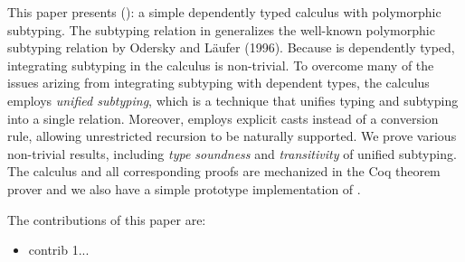 This paper presents \system (\name): a simple dependently typed
calculus with polymorphic subtyping. The subtyping relation in \name
generalizes the well-known polymorphic subtyping relation by Odersky
and L\"aufer (1996). Because \name is dependently typed, integrating
subtyping in the calculus is non-trivial. To overcome many of the
issues arizing from integrating subtyping with dependent types, the
calculus employs \emph{unified subtyping}, which is a technique that
unifies typing and subtyping into a single relation. Moreover, \name
employs explicit casts instead of a conversion rule, allowing
unrestricted recursion to be naturally supported.  We prove various
non-trivial results, including \emph{type soundness} and
\emph{transitivity} of unified subtyping. The calculus and all
corresponding proofs are mechanized in the Coq theorem prover and we
also have a simple prototype implementation of \name.

The contributions of this paper are:

\begin{itemize}

\item contrib 1...

\end{itemize}
